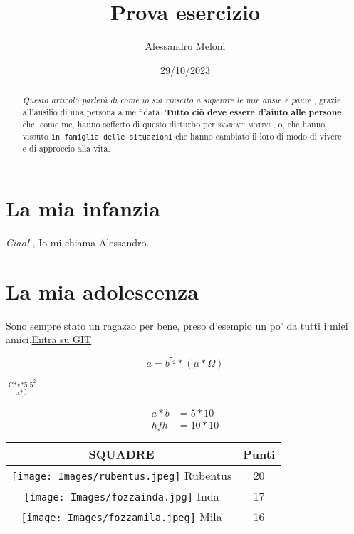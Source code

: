 \documentclass{article}
\title{Prova esercizio}
\author{Alessandro Meloni}
\date{29/10/2023}
\begin{document}
\maketitle
\begin{abstract}
    \textit{Questo articolo parlerà di come io sia riuscito a superare le mie ansie e paure} , grazie all'ausilio di una persona a me fidata.\citep{Brooks1997Methodology}
    \textbf{Tutto ciò deve essere d'aiuto alle persone} che, come me, hanno sofferto di questo disturbo per \textsc{svariati motivi} , o, che hanno vissuto \texttt{in famiglia delle situazioni} che hanno cambiato il loro di modo di vivere e di approccio alla vita.
\end{abstract}
\tableofcontents
\newpage
  \centering
  \section{La mia infanzia}
  \flushleft \emph{Ciao!} , Io mi chiama Alessandro.\citep{Karthik2001Analysis}

\newpage
   \centering
   \section{La mia adolescenza}
   \flushleft Sono sempre stato un ragazzo per bene, preso d'esempio un po' da tutti i miei amici.\href{https://github.com/}{Entra su GIT}
   
\newpage
\begin{equation*}
   a = b^{5_2} * (\mu * \Omega)
\end{equation*}

\begin{center}
    \begin{math}
    \frac{\operatorname{C*v*5}5^2}
        {\operatorname{\alpha*\beta}}
\end{math}
\end{center}

\begin{align}
    a*b & = 5 * 10\\
    hfh & = 10 * 10
\end{align}
\begin{center}
  \begin{tabular}{|c|c|}\hline 
   SQUADRE & Punti \\ \hline
   \texttt{[image: Images/rubentus.jpeg]} Rubentus & 20 \\ \hline
   \texttt{[image: Images/fozzainda.jpg]} Inda & 17 \\ \hline
   \texttt{[image: Images/fozzamila.jpeg]} Mila & 16 \\ \hline
\end{tabular}\\  
\end{center}
\end{document}
